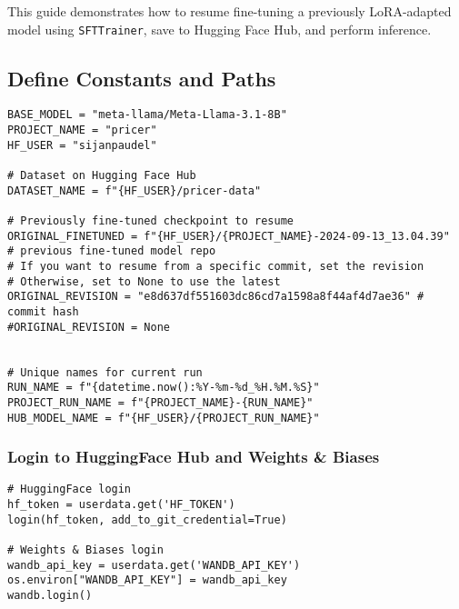 This guide demonstrates how to resume fine-tuning a previously LoRA-adapted model using \texttt{SFTTrainer}, save to Hugging Face Hub, and perform inference.

\subsection{Define Constants and Paths}
\begin{tcolorbox}[colback=yellow!5!white, colframe=yellow!75!black, title=Project Paths and Model Info]
\begin{verbatim}
BASE_MODEL = "meta-llama/Meta-Llama-3.1-8B"
PROJECT_NAME = "pricer"
HF_USER = "sijanpaudel"

# Dataset on Hugging Face Hub
DATASET_NAME = f"{HF_USER}/pricer-data"

# Previously fine-tuned checkpoint to resume
ORIGINAL_FINETUNED = f"{HF_USER}/{PROJECT_NAME}-2024-09-13_13.04.39"  
# previous fine-tuned model repo
# If you want to resume from a specific commit, set the revision
# Otherwise, set to None to use the latest
ORIGINAL_REVISION = "e8d637df551603dc86cd7a1598a8f44af4d7ae36" # commit hash
#ORIGINAL_REVISION = None


# Unique names for current run
RUN_NAME = f"{datetime.now():%Y-%m-%d_%H.%M.%S}"
PROJECT_RUN_NAME = f"{PROJECT_NAME}-{RUN_NAME}"
HUB_MODEL_NAME = f"{HF_USER}/{PROJECT_RUN_NAME}"
\end{verbatim}
\end{tcolorbox}

\subsubsection{Login to HuggingFace Hub and Weights \& Biases}
\begin{tcolorbox}[colback=blue!5!white, colframe=blue!75!black, title=Authentication]
\begin{verbatim}
# HuggingFace login
hf_token = userdata.get('HF_TOKEN')
login(hf_token, add_to_git_credential=True)

# Weights & Biases login
wandb_api_key = userdata.get('WANDB_API_KEY')
os.environ["WANDB_API_KEY"] = wandb_api_key
wandb.login()
\end{verbatim}
\end{tcolorbox}

